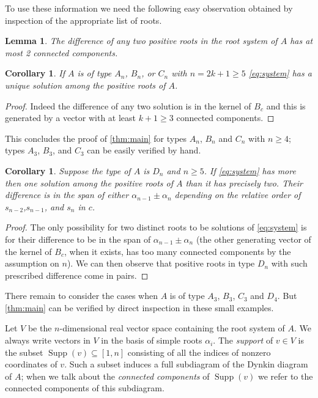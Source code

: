 \documentclass[11pt]{amsart}
\newcommand{\Supp}{\operatorname{Supp}}
\newtheorem{corollary}[theorem]{Corollary}
\newtheorem{lemma}[theorem]{Lemma}
\numberwithin{equation}{section}
\begin{document}
  To use these information we need the following easy observation obtained by inspection of the appropriate list of roots.
  \begin{lemma}
    The difference of any two positive roots in the root system of $A$ has at most 2 connected components.
  \end{lemma}

  \begin{corollary}
    If $A$ is of type $A_n$, $B_n$, or $C_n$ with $n=2k+1\geq 5$ \cref{eq:system} has a unique solution among the positive roots of $A$.
  \end{corollary}
  \begin{proof}
    Indeed the difference of any two solution is in the kernel of $B_c$ and this is generated by a vector with at least $k+1\geq3$ connected components.
  \end{proof}
  This concludes the proof of \cref{thm:main} for types $A_n$, $B_n$ and $C_n$ with $n\geq4$; types $A_3$, $B_3$, and $C_3$ can be easily verified by hand.
    
  \begin{corollary}
    Suppose the type of $A$ is $D_n$ and $n\geq 5$. 
    If \cref{eq:system} has more then one solution among the positive roots of $A$ than it has precisely two.
    Their difference is in the span of either $\alpha_{n-1}\pm\alpha_n$ depending on the relative order of $s_{n-2}$,$s_{n-1}$, and $s_n$ in $c$.
  \end{corollary}
  \begin{proof}
    The only possibility for two distinct roots to be solutions of \cref{eq:system} is for their difference to be in the span of $\alpha_{n-1}\pm\alpha_n$ (the other generating vector of the kernel of $B_c$, when it exists, has too many connected components by the assumption on $n$). 
    We can then observe that positive roots in type $D_n$ with such prescribed difference come in pairs.
  \end{proof}

  There remain to consider the cases when $A$ is of type $A_3$, $B_3$, $C_3$ and $D_4$.
  But \cref{thm:main} can be verified by direct inspection in these small examples.

  Let $V$ be the $n$-dimensional real vector space containing the root system of $A$.
  We always write vectors in $V$ in the basis of simple roots $\alpha_i$.
  The \emph{support} of $v\in V$ is the subset $\Supp(v)\subseteq [1,n]$ consisting of all the indices of nonzero coordinates of $v$.
  Such a subset induces a full subdiagram of the Dynkin diagram of $A$; when we talk about the \emph{connected components} of $\Supp(v)$ we refer to the connected components of this subdiagram.



\end{document}
